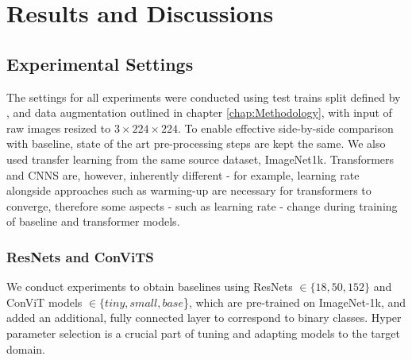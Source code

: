 \chapter{Results and Discussions}
\label{chap:Results}

\section{Experimental Settings}
\label{experimental_settings} 
The settings for all experiments were conducted using test trains split defined by \cite{Talebi2018}, and data augmentation outlined in chapter \ref{chap:Methodology}, with input of raw images resized to $3 \times 224 \times 224$. To enable effective side-by-side comparison with baseline, state of the art pre-processing steps are kept the same. We also used transfer learning from the same source dataset, ImageNet1k. Transformers and CNNS are, however, inherently different - for example, learning rate alongside approaches such as warming-up\cite{Zhang2021} are necessary for transformers to converge, therefore some aspects - such as learning rate - change during training of baseline and transformer models. 


\subsection{ResNets and ConViTS}


We conduct experiments to obtain baselines using ResNets $\in\{18,50,152\}$ and ConViT models $\in\{tiny,small,base$\}$ $, which are pre-trained on ImageNet-1k, and added an additional, fully connected layer to correspond to binary classes. Hyper parameter selection is a crucial part of tuning and adapting models to the target domain. 




